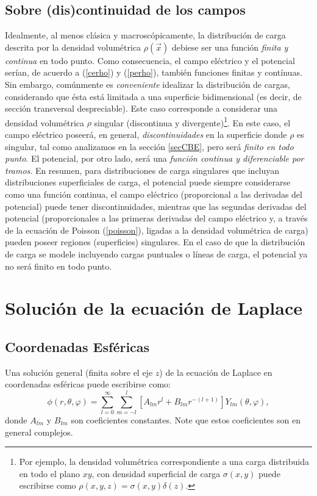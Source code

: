 \subsection{Sobre (dis)continuidad de los campos}
 Idealmente, al menos clásica y macroscópicamente, la distribución de carga descrita por la densidad volumétrica $\rho(\vec{x})$ debiese ser una función \textit{finita y continua} en todo punto. Como consecuencia, el campo eléctrico y el potencial serían, de acuerdo a (\ref{cerho}) y (\ref{perho}), también funciones finitas y contínuas. Sin embargo, comúnmente es \textit{conveniente} idealizar la distribución de cargas, considerando que ésta está limitada a una superficie bidimensional (es decir, de sección transversal despreciable). Este caso corresponde a considerar una densidad volumétrica $\rho$ singular (discontinua y divergente)\footnote{Por ejemplo, la densidad volumétrica correspondiente a una carga distribuida en todo el plano $xy$, con densidad superficial de carga $\sigma(x,y)$ puede escribirse como $\rho(x,y,z)=\sigma(x,y)\delta(z)$.}. En este caso, el campo eléctrico poseerá, en general, \textit{discontinuidades} en la superficie donde $\rho$ es singular, tal como analizamos en la sección \ref{secCBE}, pero será \textit{finito en todo punto}. El potencial, por otro lado, será una \textit{función continua y diferenciable por tramos}. En resumen, para distribuciones de carga singulares que incluyan distribuciones superficiales de carga, el potencial puede siempre considerarse como una función continua, el campo eléctrico (proporcional a las derivadas del potencial) puede tener discontinuidades, mientras que las segundas derivadas del potencial (proporcionales a las primeras derivadas del campo eléctrico y, a través de la ecuación de Poisson (\ref{poisson}), ligadas a la densidad volumétrica de carga) pueden poseer regiones (superficies) singulares. En el caso de que la distribución de carga se modele incluyendo cargas puntuales o líneas de carga, el potencial ya no será finito en todo punto.


\section{Solución de la ecuación de Laplace}
\subsection{Coordenadas Esféricas}
Una solución general (finita sobre el eje $z$) de la ecuación de Laplace en coordenadas esféricas puede escribirse como:
\begin{equation}
  \boxed{\phi(r,\theta,\varphi) = \sum_{l=0}^\infty\sum_{m=-l}^l\left[
  A_{lm}  r^l + B_{lm}  r^{-(l+1)}\right]  Y_{lm}(\theta,\varphi),}
  \label{est31b}
\end{equation}
donde $A_{lm}$ y $B_{lm}$ son coeficientes constantes. Note que estos
coeficientes son en general complejos.

